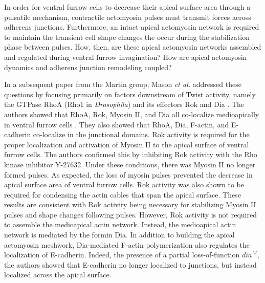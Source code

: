 \documentclass{ucetd}
\begin{document}
In order for ventral furrow cells to decrease their apical surface area through a pulsatile mechanism, contractile actomyosin pulses must transmit forces across adherens junctions.  Furthermore, an intact apical actomyosin network is required to maintain the transient cell shape changes the occur during the stabilization phase between pulses.  How, then, are these apical actomyosin networks assembled and regulated during ventral furrow invagination?  How are apical actomyosin dynamics and adherens junction remodeling coupled?

In a subsequent paper from the Martin group, Mason \textit{et al.} addressed these questions by focusing primarily on factors downstream of Twist activity, namely the GTPase RhoA (Rho1 in \textit{Drosophila}) and its effectors Rok and Dia \cite{Mason:2013ee}.  The authors showed that RhoA, Rok, Myosin II, and Dia all co-localize medioapically in ventral furrow cells \cite{Mason:2013ee}.  They also showed that RhoA, Dia, F-actin, and E-cadherin co-localize in the junctional domains.  Rok activity is required for the proper localization and activation of Myosin II to the apical surface of ventral furrow cells.  The authors confirmed this by inhibiting Rok activity with the Rho kinase inhibitor Y-27632.  Under these conditions, there was  Myosin II no longer formed pulses.  As expected, the loss of myosin pulses prevented the decrease in apical surface area of ventral furrow cells.  Rok activity was also shown to be required for condensing the actin cables that span the apical surface.  These results are consistent with Rok activity being necessary for stabilizing Myosin II pulses and shape changes following pulses.  However, Rok activity is not required  to assemble the medioapical actin network.  Instead, the medioapical actin network is mediated by the formin Dia.  In addition to building the apical actomyosin meshwork, Dia-mediated F-actin polymerization also regulates the localization of E-cadherin.  Indeed, the presence of a partial loss-of-function $\textit{dia}^M$, the authors showed that E-cadherin no longer localized to junctions, but instead localized across the apical surface.
\end{document}
